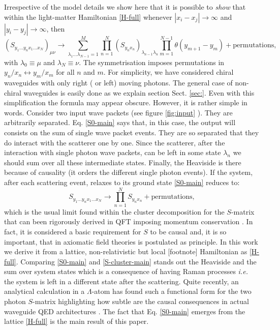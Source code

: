 \documentclass[notitlepage, prx, preprint, amsmath,superscriptaddress,amssymb]{revtex4-1}
\begin{document}
 Irrespective of the  model details  we show here that  it is possible to \emph{show} that within the light-matter Hamiltonian \eqref{H-full} whenever $|x_i -x_j| \to \infty$ and $|y_i -y_j| \to \infty$, then
\begin{equation}
\label{S0-main}
( S_{y_1 ...y_n x_1...x_N} )_{\mu \nu} \to
\sum_{\lambda_1\dots \lambda_{N-1}=1}^M\prod_{n=1}^N (S_{y_nx_n})_{\lambda_{n-1}\lambda_n}
\prod_{m=1}^{N-1}\theta(y_{m+1}-y_m) + \text{permutations},
\end{equation}
with $\lambda_0\equiv \mu$ and $\lambda_N\equiv\nu$.  The symmetrisation imposes permutations in $y_n/x_n\leftrightarrow y_m/x_m$ for all $n$ and $m$.
For simplicity, we have considered chiral waveguides with only right ( or left) moving photons.   The general case of non-chiral waveguides is easily done as we explain section Sect. \ref{sec:}.   Even with this simplification  the formula may appear obscure.  However, it  is rather simple in words.   Consider  two input  wave packets (see figure \ref{fig:input} ).  They are  {\color{red} arbitrarily separated}.  Eq. \eqref{S0-main} says that, in this case,  the output will consists on the sum of single wave packet events.  They are so separated that they do interact with the scatterer {\color{red}one by one}.  Since the scatterer, after the interaction with single photon wave packets, can be left in some state $\lambda_n$ we should sum over all these intermediate states.  Finally, the Heaviside is there because of causality (it orders the different single photon events).   If the system, after each scattering event, relaxes to its ground state  \eqref{S0-main} reduces to:
\begin{equation}
\label{S-cluster-main}
 S_{y_1 ...y_n x_1...x_N}  \to \prod_{n=1}^N S_{y_nx_n}
+ \text{permutations},
\end{equation}
which is the usual limit  found within the cluster decomposition for the $S$-matrix that 
 can been  rigorously   derived in QFT  imposing momentum conservation \cite[Chap. 4]{weinberg1995}.  In fact, it is considered a basic requirement for $S$ to be causal and, it is so important, that in axiomatic field theories is postulated as principle.   In this work we derive it from a lattice, non-relativistic but local [footnote] Hamiltonian as \eqref{H-full}.  Comparing \eqref{S0-main} and \eqref{S-cluster-main} stands out the Heaviside and the sum over system states which is a consequence of  having Raman processes \emph{i.e.} the system is left in a different state after the scattering.   
Quite recently, an analytical calculation in a  $\Lambda$-atom  has found such a functional form for the two photon $S$-matrix highlighting how subtle are the causal consequences in actual waveguide QED architectures \cite{Xu2016} .    The fact that Eq. \eqref{S0-main} emerges from the lattice \eqref{H-full} is the main result of this paper.
\end{document}
